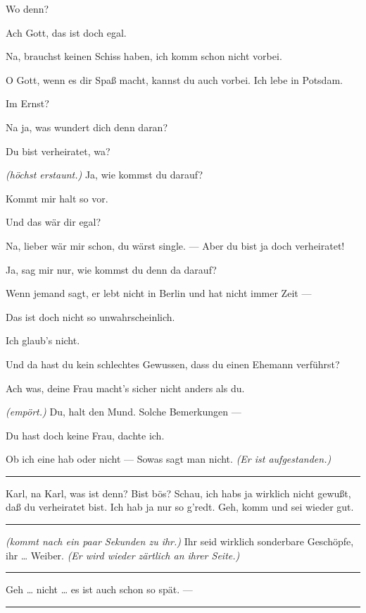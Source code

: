 \documentclass[
	final,
	a4paper,
	ngerman,
	mpinclude = true, %
	twoside = true,
	open = right,
	cleardoublepage = plain,
	DIV = 13,
	BCOR = 1cm,
	titlepage = firstiscover,
	]{scrbook}
\newcommand{\direction}[1]{\textit{(#1)}}
\newenvironment{deletion}{%
		\vspace{0.25\baselineskip}
		\hrule
		\vspace{0.25\baselineskip}
		\color{darkgray}
	}{
		\color{black}
		\vspace{0.25\baselineskip}
		\hrule 
		\vspace{0.25\baselineskip}
	}
\newcommand{\thecharacter}[1]{\textup{\textsc{#1}}\xspace}
\newcommand{\thegatte}{\thecharacter{Christian}}
\newcommand{\thesuesse}{\thecharacter{Lola}}
\newcommand{\character}[1]{\item[#1:]}
\newcommand{\gatte}{\character{\thegatte}}
\newcommand{\suesse}{\character{\thesuesse}}
\begin{document}
\begin{play}
	\suesse
	Wo denn?

	\gatte
	Ach Gott, das ist doch egal.

	\suesse
	Na, brauchst keinen Schiss haben, ich komm schon nicht vorbei.

	\gatte
	O Gott, wenn es dir Spaß macht, kannst du auch vorbei. Ich lebe in Potsdam.

	\suesse
	Im Ernst?

	\gatte
	Na ja, was wundert dich denn daran?

	\suesse
	Du bist verheiratet, wa?

	\gatte
	\direction{höchst erstaunt.} Ja, wie kommst du darauf?

	\suesse
	Kommt mir halt so vor.

	\gatte
	Und das wär dir egal?

	\suesse
	Na, lieber wär mir schon, du wärst single. --- Aber du bist ja doch verheiratet!

	\gatte
	Ja, sag mir nur, wie kommst du denn da darauf?

	\suesse
	Wenn jemand sagt, er lebt nicht in Berlin und hat nicht immer Zeit ---

	\gatte
	Das ist doch nicht so unwahrscheinlich.

	\suesse
	Ich glaub's nicht.

	\gatte
	Und da hast du kein schlechtes Gewussen, dass du einen Ehemann verführst?

	\suesse
	Ach was, deine Frau macht's sicher nicht anders als du.

	\gatte
	\direction{empört.} Du, halt den Mund. Solche Bemerkungen ---

	\suesse
	Du hast doch keine Frau, dachte ich.

	\gatte
	Ob ich eine hab oder nicht --- Sowas sagt man nicht. \direction{Er ist aufgestanden.}

	\begin{deletion}
	\suesse
	Karl, na Karl, was ist denn? Bist bös? Schau, ich habs ja wirklich nicht gewußt, daß du verheiratet bist. Ich hab ja nur so g'redt. Geh, komm und sei wieder gut.

	\gatte
	\end{deletion}
	\direction{kommt nach ein paar Sekunden zu ihr.} Ihr seid wirklich sonderbare Geschöpfe, ihr \ldots{} Weiber. \direction{Er wird wieder zärtlich an ihrer Seite.}

	\begin{deletion}
	\suesse
	Geh \ldots{} nicht \ldots{} es ist auch schon so spät. ---


\end{deletion}
\end{play}
\end{document}
